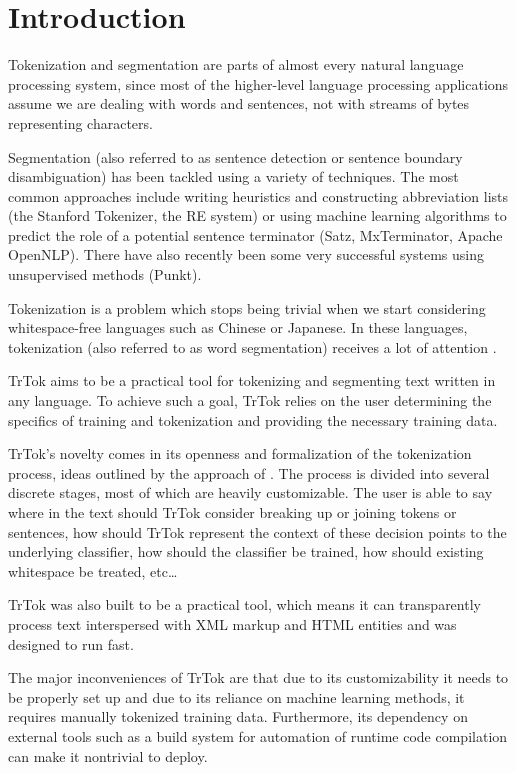 \section{Introduction}
\label{sec:introduction}

Tokenization and segmentation are parts of almost every natural
language processing system, since most of the higher-level language
processing applications assume we are dealing with words and
sentences, not with streams of bytes representing characters.

Segmentation (also referred to as sentence detection or sentence
boundary disambiguation) has been tackled using a variety of
techniques. The most common approaches include writing heuristics and
constructing abbreviation lists (the Stanford Tokenizer, the RE
system) or using machine learning algorithms to predict the role of a
potential sentence terminator (Satz, MxTerminator, Apache OpenNLP).
There have also recently been some very successful systems using
unsupervised methods (Punkt).

Tokenization is a problem which stops being trivial when we start
considering whitespace-free languages such as Chinese or Japanese. In
these languages, tokenization (also referred to as word segmentation)
receives a lot of attention \cite{seg-bakeoff}.

TrTok aims to be a practical tool for tokenizing and segmenting text
written in any language. To achieve such a goal, TrTok relies on the
user determining the specifics of training and tokenization and
providing the necessary training data.

TrTok's novelty comes in its openness and formalization of the
tokenization process, ideas outlined by the approach of
. The process is divided into several discrete
stages, most of which are heavily customizable. The user is able to
say where in the text should TrTok consider breaking up or joining
tokens or sentences, how should TrTok represent the context of these
decision points to the underlying classifier, how should the
classifier be trained, how should existing whitespace be treated,
etc\ldots

TrTok was also built to be a practical tool, which means it can
transparently process text interspersed with XML markup and HTML
entities and was designed to run fast.

The major inconveniences of TrTok are that due to its customizability
it needs to be properly set up and due to its reliance on machine
learning methods, it requires manually tokenized training data.
Furthermore, its dependency on external tools such as a build system
for automation of runtime code compilation can make it nontrivial to
deploy.
